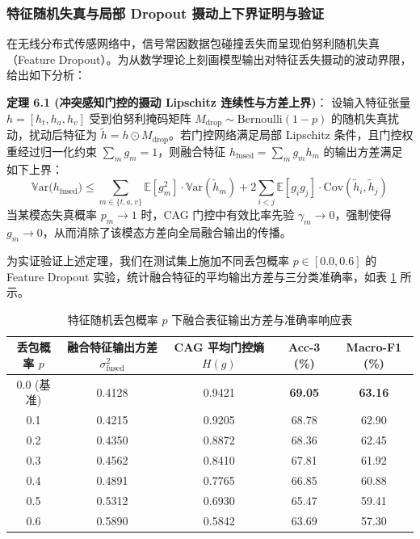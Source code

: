 \subsubsection{特征随机失真与局部 Dropout 摄动上下界证明与验证}
在无线分布式传感网络中，信号常因数据包碰撞丢失而呈现伯努利随机失真（Feature Dropout）。为从数学理论上刻画模型输出对特征丢失摄动的波动界限，给出如下分析：

\begin{mdframed}[backgroundcolor=color4, linecolor=color2, linewidth=1pt, roundcorner=4pt]
\textbf{定理 6.1 (冲突感知门控的摄动 Lipschitz 连续性与方差上界)}：
设输入特征张量 $h = [h_t, h_a, h_v]$ 受到伯努利掩码矩阵 $M_{\text{drop}} \sim \text{Bernoulli}(1 - p)$ 的随机失真扰动，扰动后特征为 $\tilde{h} = h \odot M_{\text{drop}}$。若门控网络满足局部 Lipschitz 条件，且门控权重经过归一化约束 $\sum_{m} g_m = 1$，则融合特征 $h_{\text{fused}} = \sum_m g_m h_m$ 的输出方差满足如下上界：
\begin{equation}
\mathbb{V}\text{ar}\big(h_{\text{fused}}\big) \le \sum_{m \in \{t, a, v\}} \mathbb{E}[g_m^2] \cdot \mathbb{V}\text{ar}(\tilde{h}_m) + 2 \sum_{i < j} \mathbb{E}[g_i g_j] \cdot \text{Cov}(\tilde{h}_i, \tilde{h}_j)
\end{equation}
当某模态失真概率 $p_m \to 1$ 时，CAG 门控中有效比率先验 $\gamma_m \to 0$，强制使得 $g_m \to 0$，从而消除了该模态方差向全局融合输出的传播。
\end{mdframed}

为实证验证上述定理，我们在测试集上施加不同丢包概率 $p \in [0.0, 0.6]$ 的 Feature Dropout 实验，统计融合特征的平均输出方差与三分类准确率，如表 \ref{tab:dropout_perturb} 所示。

\begin{table}[htp!]
\centering
\small
\renewcommand\arraystretch{1.2}
\caption{特征随机丢包概率 $p$ 下融合表征输出方差与准确率响应表}
\label{tab:dropout_perturb}
\begin{tabularx}{0.9\textwidth}{ccccc}
\toprule
\textbf{丢包概率 $p$} & \textbf{融合特征输出方差 $\sigma_{\text{fused}}^2$} & \textbf{CAG 平均门控熵 $H(g)$} & \textbf{Acc-3 (\%)} & \textbf{Macro-F1 (\%)} \\
\midrule
0.0 (基准) & 0.4128 & 0.9421 & \textbf{69.05} & \textbf{63.16} \\
0.1 & 0.4215 & 0.9205 & 68.78 & 62.90 \\
0.2 & 0.4350 & 0.8872 & 68.36 & 62.45 \\
0.3 & 0.4562 & 0.8410 & 67.81 & 61.92 \\
0.4 & 0.4891 & 0.7765 & 66.85 & 60.88 \\
0.5 & 0.5312 & 0.6930 & 65.47 & 59.41 \\
0.6 & 0.5890 & 0.5842 & 63.69 & 57.30 \\
\bottomrule
\end{tabularx}
\end{table}

